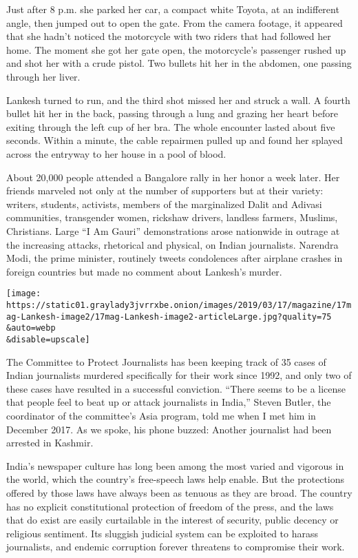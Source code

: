 Just after 8 p.m. she parked her car, a compact white Toyota, at an
indifferent angle, then jumped out to open the gate. From the camera
footage, it appeared that she hadn't noticed the motorcycle with two
riders that had followed her home. The moment she got her gate open, the
motorcycle's passenger rushed up and shot her with a crude pistol. Two
bullets hit her in the abdomen, one passing through her liver.

Lankesh turned to run, and the third shot missed her and struck a wall.
A fourth bullet hit her in the back, passing through a lung and grazing
her heart before exiting through the left cup of her bra. The whole
encounter lasted about five seconds. Within a minute, the cable
repairmen pulled up and found her splayed across the entryway to her
house in a pool of blood.

About 20,000 people attended a Bangalore rally in her honor a week
later. Her friends marveled not only at the number of supporters but at
their variety: writers, students, activists, members of the marginalized
Dalit and Adivasi communities, transgender women, rickshaw drivers,
landless farmers, Muslims, Christians. Large ``I Am Gauri''
demonstrations arose nationwide in outrage at the increasing attacks,
rhetorical and physical, on Indian journalists. Narendra Modi, the prime
minister, routinely tweets condolences after airplane crashes in foreign
countries but made no comment about Lankesh's murder.

\texttt{[image: https://static01.graylady3jvrrxbe.onion/images/2019/03/17/magazine/17mag-Lankesh-image2/17mag-Lankesh-image2-articleLarge.jpg?quality=75\\\&auto=webp\\\&disable=upscale]}

The Committee to Protect Journalists has been keeping track of 35 cases
of Indian journalists murdered specifically for their work since 1992,
and only two of these cases have resulted in a successful conviction.
``There seems to be a license that people feel to beat up or attack
journalists in India,'' Steven Butler, the coordinator of the
committee's Asia program, told me when I met him in December 2017. As we
spoke, his phone buzzed: Another journalist had been arrested in
Kashmir.

India's newspaper culture has long been among the most varied and
vigorous in the world, which the country's free-speech laws help enable.
But the protections offered by those laws have always been as tenuous as
they are broad. The country has no explicit constitutional protection of
freedom of the press, and the laws that do exist are easily curtailable
in the interest of security, public decency or religious sentiment. Its
sluggish judicial system can be exploited to harass journalists, and
endemic corruption forever threatens to compromise their work.

